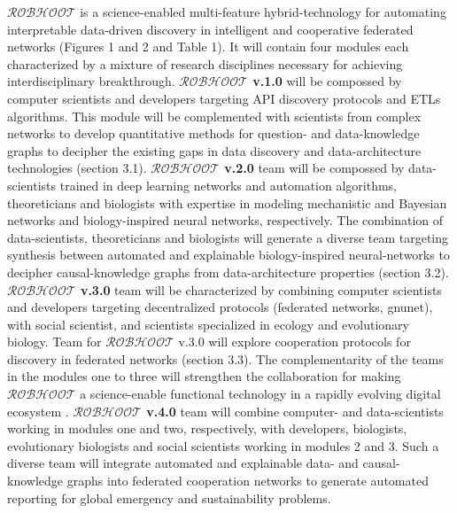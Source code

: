 \documentclass[11pt, a4paper]{article} %
\begin{document}
  {\bf $\mathcal{ROBHOOT}$} is a science-enabled multi-feature
  hybrid-technology for automating interpretable data-driven discovery
  in intelligent and cooperative federated networks (Figures 1 and 2
  and Table 1). It will contain four modules each characterized by a
  mixture of research disciplines necessary for achieving
  interdisciplinary breakthrough. {\bf $\mathcal{ROBHOOT}$ v.1.0} will
  be compossed by computer scientists and developers targeting API
  discovery protocols and ETLs algorithms. This module will be
  complemented with scientists from complex networks to develop
  quantitative methods for question- and data-knowledge graphs to
  decipher the existing gaps in data discovery and data-architecture
  technologies (section 3.1). {\bf $\mathcal{ROBHOOT}$ v.2.0} team
  will be compossed by data-scientists trained in deep learning
  networks and automation algorithms, theoreticians and biologists
  with expertise in modeling mechanistic and Bayesian networks and
  biology-inspired neural networks, respectively. The combination of
  data-scientists, theoreticians and biologists will generate a
  diverse team targeting synthesis between automated and explainable
  biology-inspired neural-networks to decipher causal-knowledge graphs
  from data-architecture properties (section 3.2). {\bf
    $\mathcal{ROBHOOT}$ v.3.0} team will be characterized by combining
  computer scientists and developers targeting decentralized protocols
  (federated networks, gnunet), with social scientist, and scientists
  specialized in ecology and evolutionary biology. Team for
  $\mathcal{ROBHOOT}$ v.3.0 will explore cooperation protocols for
  discovery in federated networks (section 3.3). The complementarity
  of the teams in the modules one to three will strengthen the
  collaboration for making $\mathcal{ROBHOOT}$ a science-enable
  functional technology in a rapidly evolving digital ecosystem
  \citep{Soto-Valero2019}. {\bf $\mathcal{ROBHOOT}$ v.4.0} team will
  combine computer- and data-scientists working in modules one and
  two, respectively, with developers, biologists, evolutionary
  biologists and social scientists working in modules 2 and 3. Such a
  diverse team will integrate automated and explainable data- and
  causal-knowledge graphs into federated cooperation networks to
  generate automated reporting for global emergency and sustainability
  problems.
\end{document}
